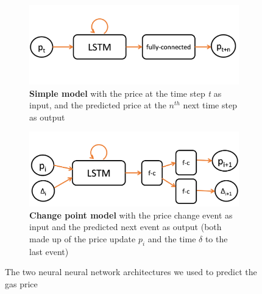 \begin{figure}
  	\begin{subfigure}{0.45\textwidth}
    \begin{center}
    \includegraphics[width=1\textwidth]{img/simple-model.png}
    \end{center}
     \caption{\textbf{Simple model} with the price at the time step \textit{t} as input, and the predicted price at the $n^{th}$ next time step as output}
     \label{simple-model}
  	\end{subfigure}
    \begin{subfigure}{0.45\textwidth}
    \begin{center}
    \includegraphics[width=1\textwidth]{img/change-model.png}
    \end{center}
     \caption{\textbf{Change point model} with the price change event as input and the predicted next event as output (both made up of the price update $p_i$ and the time $\delta$ to the last event)}
     \label{change-model}
  	\end{subfigure}
    \caption{The two neural neural network architectures we used to predict the gas price}
\end{figure}